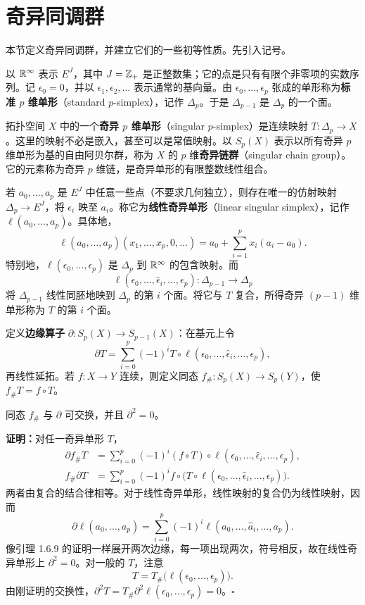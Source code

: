 \section{奇异同调群}
本节定义奇异同调群，并建立它们的一些初等性质。先引入记号。

以 $\mathbb{R}^\infty$ 表示 $E^J$，其中 $J=\mathbb{Z}_+$ 是正整数集；它的点是只有有限个非零项的实数序列。记 $\epsilon_0=0$，并以 $\epsilon_1,\epsilon_2,\ldots$ 表示通常的基向量。由 $\epsilon_0,\ldots,\epsilon_p$ 张成的单形称为\textbf{标准 $p$ 维单形}（standard $p$-simplex），记作 $\Delta_p$。于是 $\Delta_{p-1}$ 是 $\Delta_p$ 的一个面。

拓扑空间 $X$ 中的一个\textbf{奇异 $p$ 维单形}（singular $p$-simplex）是连续映射 $T:\Delta_p\to X$。这里的映射不必是嵌入，甚至可以是常值映射。以 $S_p(X)$ 表示以所有奇异 $p$ 维单形为基的自由阿贝尔群，称为 $X$ 的 $p$ 维\textbf{奇异链群}（singular chain group）。它的元素称为奇异 $p$ 维链，是奇异单形的有限整数线性组合。

若 $a_0,\ldots,a_p$ 是 $E^J$ 中任意一些点（不要求几何独立），则存在唯一的仿射映射 $\Delta_p\to E^J$，将 $\epsilon_i$ 映至 $a_i$。称它为\textbf{线性奇异单形}（linear singular simplex），记作 $\ell(a_0,\ldots,a_p)$。具体地，
\[
\ell(a_0,\ldots,a_p)(x_1,\ldots,x_p,0,\ldots)
=a_0+\sum_{i=1}^p x_i(a_i-a_0).
\]
特别地，$\ell(\epsilon_0,\ldots,\epsilon_p)$ 是 $\Delta_p$ 到 $\mathbb{R}^\infty$ 的包含映射。而
\[
\ell(\epsilon_0,\ldots,\widehat\epsilon_i,\ldots,\epsilon_p):\Delta_{p-1}\longrightarrow\Delta_p
\]
将 $\Delta_{p-1}$ 线性同胚地映到 $\Delta_p$ 的第 $i$ 个面。将它与 $T$ 复合，所得奇异 $(p-1)$ 维单形称为 $T$ 的第 $i$ 个面。

定义\textbf{边缘算子} $\partial:S_p(X)\to S_{p-1}(X)$：在基元上令
\[
\partial T=\sum_{i=0}^p(-1)^iT\circ\ell(\epsilon_0,\ldots,\widehat\epsilon_i,\ldots,\epsilon_p),
\]
再线性延拓。若 $f:X\to Y$ 连续，则定义同态 $f_\#:S_p(X)\to S_p(Y)$，使 $f_\#T=f\circ T$。

同态 $f_\#$ 与 $\partial$ 可交换，并且 $\partial^2=0$。

\textbf{证明：}对任一奇异单形 $T$，
\begin{align*}
\partial f_\#T&=\sum_{i=0}^p(-1)^i(f\circ T)\circ\ell(\epsilon_0,\ldots,\widehat\epsilon_i,\ldots,\epsilon_p),\\
f_\#\partial T&=\sum_{i=0}^p(-1)^if\circ\bigl(T\circ\ell(\epsilon_0,\ldots,\widehat\epsilon_i,\ldots,\epsilon_p)\bigr).
\end{align*}
两者由复合的结合律相等。对于线性奇异单形，线性映射的复合仍为线性映射，因而
\[
\partial\ell(a_0,\ldots,a_p)=\sum_{i=0}^p(-1)^i\ell(a_0,\ldots,\widehat a_i,\ldots,a_p).
\]
像引理 1.6.9 的证明一样展开两次边缘，每一项出现两次，符号相反，故在线性奇异单形上 $\partial^2=0$。对一般的 $T$，注意
\[
T=T_\#\bigl(\ell(\epsilon_0,\ldots,\epsilon_p)\bigr).
\]
由刚证明的交换性，$\partial^2T=T_\#\partial^2\ell(\epsilon_0,\ldots,\epsilon_p)=0$。\hfill$\square$

